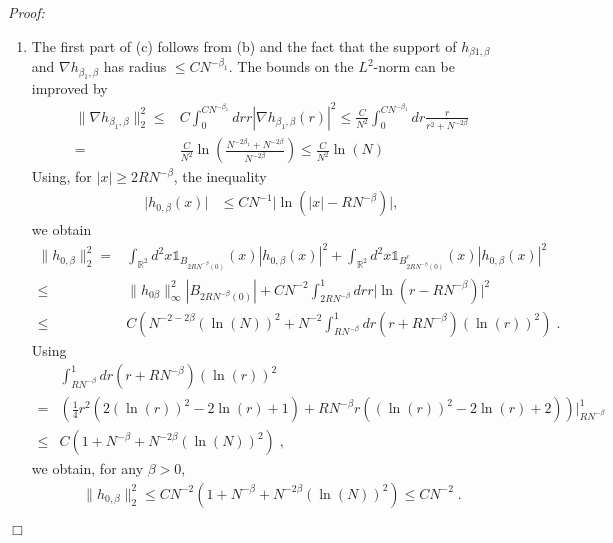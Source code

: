 \documentclass[11pt, english, american]{article}
\newenvironment{proof}{\emph{Proof:}}{\begin{flushright} $ \Box $ \end{flushright}}
\begin{document}
\begin{proof}
\begin{enumerate}
\item The first part of (c) follows from (b) and the fact that the support of $h_{\beta1,\beta}$ and $\nabla h_{\beta_1,\beta}$ has radius $\leq CN^{-\beta_1}$.
The bounds on the $L^2$-norm can be improved by
\begin{align*}
 \|\nabla h_{\beta_1,\beta}\|_{2}^2\leq&
 C \int_0^{C N^{-\beta_1}} dr r |\nabla h_{\beta_1,\beta}(r)|^2
 \leq
  \frac{C}{N^2} \int_0^{C N^{-\beta_1}} dr \frac{r}{r^2+N^{-2\beta } } 
  \\
  =&
  \frac{C}{N^2} \ln \left(\frac{N^{-2\beta_1 }+N^{-2\beta }}{N^{-2\beta }} \right)
  \leq    \frac{C}{N^ 2} \ln(N)
\end{align*}
Using, for $|x|\geq 2 RN^{-\beta}$, the inequality
\begin{align*}
\vert h_{0,\beta}(x)| &\leq C N^{-1}  \vert \ln (\vert x \vert - RN^{-\beta} )\vert,
\end{align*}
we obtain
\begin{align*}
\|h_{0,\beta}\|_2^2
=&
\int_{\mathbb{R}^2} d^2x
\mathds{1}_{B_{2RN^{-\beta}(0)}}(x)
|h_{0,\beta}(x)|^2
+
\int_{\mathbb{R}^2} d^2x
\mathds{1}_{B^c_{2RN^{-\beta}(0)}}(x)
|h_{0,\beta}(x)|^2
\\
\leq &
\|h_{0\beta}\|_\infty^2
|B_{2RN^{-\beta}(0)}|
+
C N^{-2}
\int_{2 RN^{-\beta}}^1 dr
r
 \vert \ln (r - RN^{-\beta} )\vert^2
 \\
 \leq &
C
\left(
 N^{-2-2\beta} (\ln(N))^2
+
N^{-2} 
\int_{ RN^{-\beta}}^1 dr
(r+ RN^{-\beta} )
( \ln (r))^2
 \right)
 \;.
\end{align*}
Using
\begin{align*}
&\int_{ RN^{-\beta}}^1 dr
(r+ RN^{-\beta} )
( \ln (r))^2
\\
 =&
 \left(
 \frac{1}{4}r^2
  (2 (\ln(r))^2-2\ln(r)+1)
 +
 R N^{-\beta}
r( (\ln(r))^2-2 \ln(r)+2)
\right)\Big|^1_{RN^{-\beta}}
\\
\leq&
C \left(1+ N^{-\beta}+ N^{-2 \beta} (\ln(N))^2 \right) \;,
\end{align*}
we obtain, for any $\beta>0$,
\begin{align*}
\|h_{0,\beta}\|_2^2
\leq
C N^{-2}
\left(
1+
N^{-\beta}
+
N^{-2\beta}
(\ln(N))^2
\right)
\leq
C N^{-2} \;.
\end{align*}


\end{enumerate}


\end{proof}
\end{document}
